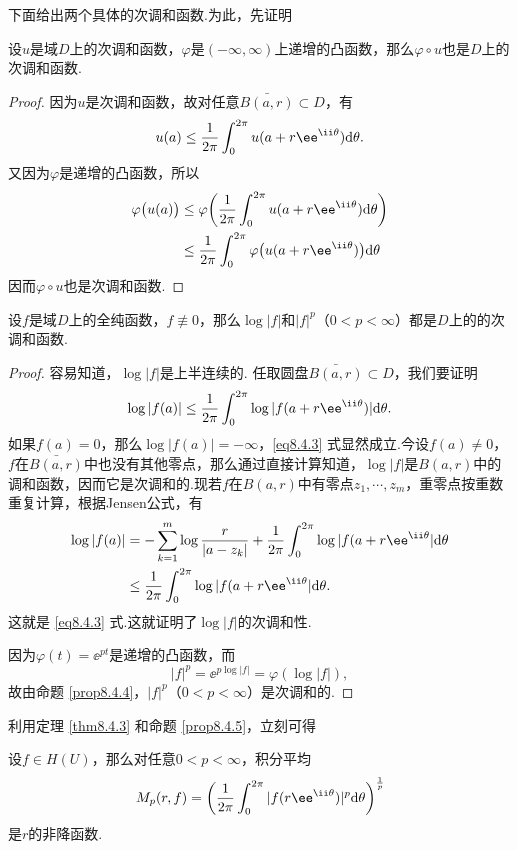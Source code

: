 下面给出两个具体的次调和函数.为此，先证明
\begin{prop}\label{prop8.4.4}
设$u$是域$D$上的次调和函数，$\varphi$是$(-\infty,\infty)$上递增的凸函数，那么$\varphi\circ u$也是$D$上的次调和函数.
\end{prop}
\begin{proof}
因为$u$是次调和函数，故对任意$\bar{B(a,r)}\subset D$，有
\[u(a)\le\frac1{2\pi}\int_0^{2\pi}u(a+r\ee^{\ii\theta})\textrm d\theta.\]
又因为$\varphi$是递增的凸函数，所以
\begin{align*}
\varphi\big(u(a)\big)&\le\varphi\bigg(\frac1{2\pi}\int_0^{2\pi}u(a+r\ee^{\ii\theta})\textrm d\theta\bigg)\\
&\le\frac1{2\pi}\int_0^{2\pi}\varphi\big(u(a+r\ee^{\ii\theta})\big)\textrm d\theta
\end{align*}
因而$\varphi\circ u$也是次调和函数.
\end{proof}

\begin{prop}\label{prop8.4.5}
设$f$是域$D$上的全纯函数，$f\not\equiv 0$，那么$\log|f|$和$|f|^p$（$0<p<\infty$）都是$D$上的的次调和函数.
\end{prop}
\begin{proof}
容易知道，$\log|f|$是上半连续的. 任取圆盘$\bar{B(a,r)}\subset D$，我们要证明
\begin{equation}\label{eq8.4.3}
\log|f(a)|\le\frac1{2\pi}\int_0^{2\pi}\log|f(a+r\ee^{\ii\theta})|\textrm d\theta.
\end{equation}
如果$f(a)=0$，那么$\log|f(a)|=-\infty$，\eqref{eq8.4.3} 式显然成立.今设$f(a)\ne0$，$f$在$\bar{B(a,r)}$中也没有其他零点，那么通过直接计算知道，$\log|f|$是$B(a,r)$中的调和函数，因而它是次调和的.现若$f$在$B(a,r)$中有零点$z_1,\cdots,z_m$，重零点按重数重复计算，根据Jensen公式，有
\begin{align*}
\log|f(a)|&=-\sum_{k=1}^m\log\frac r{|a-z_k|}+\frac1{2\pi}\int_0^{2\pi}\log|f(a+r\ee^{\ii\theta}|\textrm d\theta\\
&\le\frac1{2\pi}\int_0^{2\pi}\log|f(a+r\ee^{\ii\theta}|\textrm d\theta.
\end{align*}
这就是 \eqref{eq8.4.3} 式.这就证明了$\log|f|$的次调和性.

因为$\varphi(t)=\ee^{pt}$是递增的凸函数，而
\[|f|^p=\ee^{p\log|f|}=\varphi(\log|f|),\]
故由命题 \ref{prop8.4.4}，$|f|^p$（$0<p<\infty$）是次调和的.
\end{proof}

利用定理 \ref{thm8.4.3} 和命题 \ref{prop8.4.5}，立刻可得
\begin{prop}\label{prop8.4.6}
设$f\in H(U)$，那么对任意$0<p<\infty$，积分平均
\[M_p(r,f)=\bigg(\frac1{2\pi}\int_0^{2\pi}|f(r\ee^{\ii\theta})|^p\textrm d\theta\bigg)^{\frac1p}\]
是$r$的非降函数.
\end{prop}

